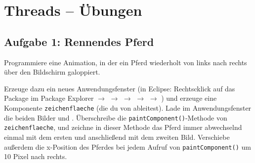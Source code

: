 \clearpage

\rehead[]{\textcolor{lightblue}{AvHG, Inf, My}}
\lohead[]{\textcolor{lightblue}{AvHG, Inf, My}}

\section{Threads -- Übungen}

\subsection{Aufgabe 1: Rennendes Pferd}

Programmiere eine Animation, in der ein Pferd wiederholt von links nach rechts
über den Bildschirm galoppiert.

Erzeuge dazu ein neues Anwendungsfenster (in Eclipse: Rechtscklick auf das
Package im Package Explorer $\rightarrow$  $\rightarrow$  $\rightarrow$  $\rightarrow$  $\rightarrow$ ) und erzeuge eine Komponente
\lstinline|zeichenflaeche| (die du von  ableitest). Lade im
Anwendungsfenster die beiden Bilder  und .
Überschreibe die \lstinline|paintComponent()|-Methode von
\lstinline|zeichenflaeche|, und zeichne in dieser Methode das Pferd immer
abwechselnd einmal mit dem ersten und anschließend mit dem zweiten Bild.
Verschiebe außerdem die x-Position des Pferdes bei jedem Aufruf von
\lstinline|paintComponent()| um 10 Pixel nach rechts.


